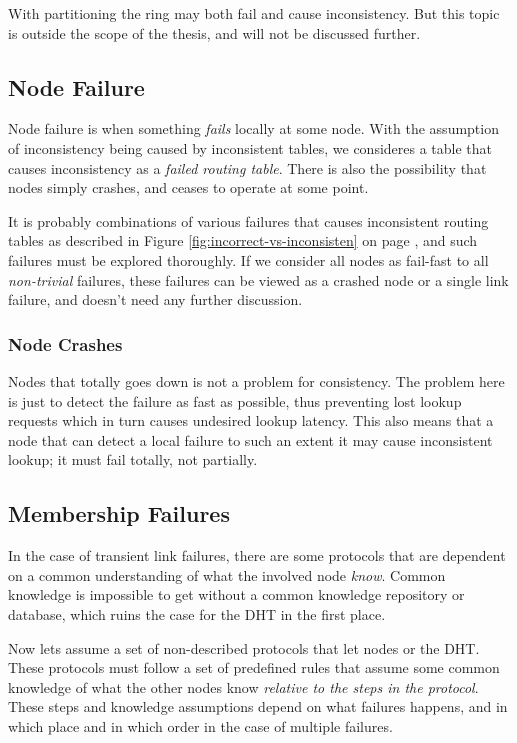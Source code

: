 With partitioning the ring may both fail and cause inconsistency. But this topic is
 outside the scope of the thesis, and will not be discussed further.

\subsection{Node Failure}
\label{analysis:NodeFailure}

Node failure is when something \emph{fails} locally at some node. With the
 assumption of inconsistency being caused by inconsistent tables, we consideres a table
 that causes inconsistency as a \emph{failed routing table}. There is also the possibility
 that nodes simply crashes, and ceases to operate at some point.

It is probably combinations of various failures that causes inconsistent routing tables as
 described in Figure \ref{fig:incorrect-vs-inconsisten} on page \pageref{fig:incorrect-vs-inconsisten},
 and such failures must be explored thoroughly. If we consider all nodes as
 fail-fast to all \emph{non-trivial} failures, these failures can be viewed as a crashed
 node or a single link failure, and doesn't need any further discussion.

\subsubsection{Node Crashes}
\label{analysis:NodeCrash}

Nodes that totally goes down is not a problem for consistency. The problem here is just to
 detect the failure as fast as possible, thus preventing lost lookup requests which in turn causes
 undesired lookup latency. This also means that a node that can detect a local failure
 to such an extent it may cause inconsistent lookup; it must fail totally, not partially.




\subsection{Membership Failures}
\label{analysis:MembershipFailure}

In the case of transient link failures, there are some protocols that are dependent on
 a common understanding of what the involved node \emph{know}. Common knowledge is impossible
 to get without a common knowledge repository or database, which ruins the case for the DHT
 in the first place.

Now lets assume a set of non-described protocols that let nodes  or 
 the DHT. These protocols must follow a set of predefined rules that assume some common
 knowledge of what the other nodes know \emph{relative to the steps in the protocol}. These steps
 and knowledge assumptions depend on what failures happens, and in which place and in
 which order in the case of multiple failures.


